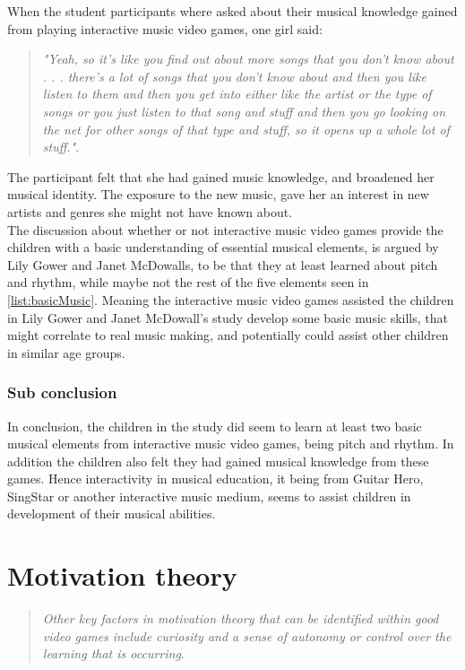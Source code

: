 When the student participants where asked about their musical knowledge gained from playing interactive music video games, one girl said:
\begin{quote}
	\textit{"Yeah, so it’s like you find out about more songs that you don’t know about . . . there’s a lot of songs that you don’t know about and then you like listen to them and then you get into either like the artist or the type of songs or you just listen to that song and stuff and then you go looking on the net for other songs of that type and stuff, so it opens up a whole lot of stuff."}\cite[p.~100]{interactiveMusicVideoGames}.\\
\end{quote}	
The participant felt that she had gained music knowledge, and broadened her musical identity. The exposure to the new music, gave her an interest in new artists and genres she might not have known about.\\

The discussion about whether or not interactive music video games provide the children with a basic understanding of essential musical elements, is argued by Lily Gower and Janet McDowalls, to be that they at least learned about pitch and rhythm, while maybe not the rest of the five elements seen in \autoref{list:basicMusic}. Meaning the interactive music video games assisted the children in Lily Gower and Janet McDowall's study develop some basic music skills, that might correlate to real music making\cite[p.~99]{interactiveMusicVideoGames}, and potentially could assist other children in similar age groups.

\subsubsection*{Sub conclusion}
In conclusion, the children in the study\cite{interactiveMusicVideoGames} did seem to learn at least two basic musical elements from interactive music video games, being pitch and rhythm. In addition the children also felt they had gained musical knowledge from these games. Hence interactivity in musical education, it being from Guitar Hero, SingStar or another interactive music medium, seems to assist children in development of their musical abilities.

\section{Motivation theory}
\begin{quote}
	\textit{Other key factors in motivation theory that can be identified within good video games include curiosity and a sense of autonomy or control over the learning that is occurring}\cite[p.~92]{interactiveMusicVideoGames}.\\
\end{quote}
